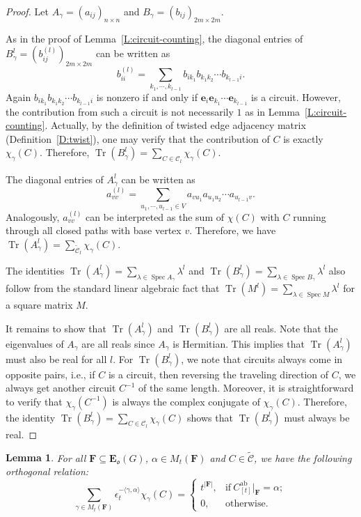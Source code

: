 \documentclass[11pt]{amsart}
\theoremstyle{plain}
\newtheorem{lemma}[theorem]{Lemma}
\theoremstyle{definition}
\newcommand{\mcalC}{{\mathcal C}}
\newcommand{\mfrako}{{\mathfrak o}}
\newcommand{\ve}{{\mathbf e}}
\newcommand{\vE}{{\mathbf E}}
\newcommand{\vF}{{\mathbf F}}
\DeclareMathOperator{\spec}{\operatorname{Spec}}
\DeclareMathOperator{\ab}{\operatorname{ab}}
\DeclareMathOperator{\trace}{\operatorname{Tr}}
\numberwithin{equation}{section}
\begin{document}
\begin{proof}
Let $A_\gamma=(a_{ij})_{n\times n}$ and $B_\gamma=(b_{ij})_{2m\times 2m}$. 

As in the proof of Lemma~\ref{L:circuit-counting}, the diagonal entries of $B_\gamma^l=\left(b^{(l)}_{ij}\right)_{2m\times 2m}$ can be written as $$b^{(l)}_{ii}=\sum_{k_1,\cdots,k_{l-1}}b_{ik_1}b_{k_1k_2}\cdots b_{k_{l-1}i}.$$  Again $b_{ik_1}b_{k_1k_2}\cdots b_{k_{l-1}i}$ is nonzero if and only if $\ve_i\ve_{k_1}\cdots\ve_{k_{l-1}}$ is a circuit.  However, the contribution from such a circuit is not necessarily $1$ as in Lemma~\ref{L:circuit-counting}.  Actually, by the definition of twisted edge adjacency matrix (Definition~\ref{D:twist}), one may verify that the contribution of $C$ is exactly $\chi_\gamma(C)$.  
Therefore, $\trace\left(B_\gamma^l\right)=\sum_{C\in \mcalC_l}\chi_\gamma(C)$. 



 The diagonal entries of $A_\gamma^l$ can be written as $$a^{(l)}_{vv}=\sum_{u_1,\cdots,u_{l-1}\in V}a_{vu_1}a_{u_1u_2}\cdots a_{u_{l-1}v}.$$ 
 Analogously, $a^{(l)}_{vv}$ can be interpreted as the sum of $\chi(C)$ with $C$ running through all closed paths with base vertex $v$.  Therefore, we have $\trace\left(A_\gamma^l\right)=\sum_{\widetilde{\mcalC}_l}\chi_\gamma(C)$. 

The identities $\trace\left(A_\gamma^l\right)=\sum_{\lambda\in \spec A_\gamma}\lambda^l$ and $\trace\left(B_\gamma^l\right)=\sum_{\lambda\in \spec B_\gamma}\lambda^l$ also follow from the standard linear algebraic fact that $\trace(M^l)=\sum_{\lambda\in \spec M}\lambda^l$ for a square matrix $M$. 

It remains to show that $\trace\left(A_\gamma^l\right)$ and $\trace\left(B_\gamma^l\right)$  are all reals. Note that the eigenvalues of $A_\gamma$ are all reals since $A_\gamma$ is Hermitian. This implies that $\trace\left(A_\gamma^l\right)$ must also be real for all $l$. For $\trace\left(B_\gamma^l\right)$, we note that circuits always come in opposite pairs, i.e., if  $C$ is a circuit, then reversing the traveling direction of $C$, we always get another circuit $C^{-1}$ of the same length. Moreover, it is straightforward to verify that $\chi_\gamma(C^{-1})$ is always the complex conjugate of $\chi_\gamma(C)$. Therefore, the identity $\trace\left(B_\gamma^l\right)=\sum_{C\in \mcalC_l}\chi_\gamma(C)$ shows that $\trace\left(B_\gamma^l\right)$ must always be real. 
\end{proof}

\begin{lemma} \label{L:orth}
For all $\vF\subseteq \vE_\mfrako(G)$, $\alpha\in M_t(\vF)$ and $C\in\widetilde{\mcalC}$, we have the following orthogonal relation:
$$\sum_{\gamma\in M_t(\vF)}\epsilon_t^{-\langle\gamma, \alpha\rangle}\chi_\gamma(C)  =\begin{cases}
      t^{|\vF|}, & \text{if}\ C^{\ab}_{[t]}|_\vF=\alpha; \\
      0, & \text{otherwise}.
    \end{cases}$$
\end{lemma}
\end{document}
